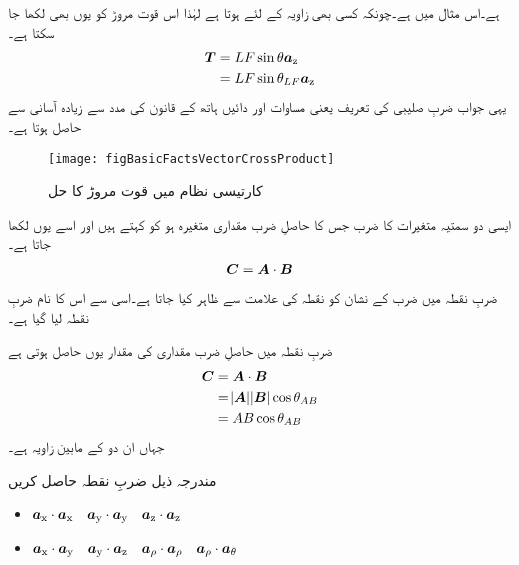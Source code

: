 ہے۔اس مثال میں  ہے۔چونکہ کسی بھی زاویہ    کے لئے  ہوتا ہے لہٰذا اس قوت مروڑ کو یوں بھی لکھا جا سکتا ہے۔
\begin{align*}
{\ensuremath{{\boldsymbol{T}}}}&=LF\sin \theta {\boldsymbol{a}}_{\textup{z}}\\
&=L F \sin \theta_{LF}{\boldsymbol{a}}_{\textup{z}}
\end{align*}
یہی جواب ضربِ صلیبی کی تعریف یعنی مساوات  اور دائیں ہاتھ کے قانون کی مدد سے زیادہ آسانی سے حاصل ہوتا ہے۔
%
\begin{figure}
\centering
\texttt{[image: figBasicFactsVectorCrossProduct]}
\caption{کارتیسی نظام میں قوت مروڑ کا حل}
\label{شکل_حقائق_کارتیسی_مروڑ_کا_حل}
\end{figure}
%
ایسی دو سمتیہ متغیرات کا ضرب جس کا حاصلِ ضرب مقداری متغیرہ ہو کو  کہتے ہیں اور اسے یوں لکھا جاتا ہے۔
\begin{align}
{\ensuremath{{\boldsymbol{C}}}}={{\boldsymbol{A}}} \cdot {\ensuremath{{\boldsymbol{B}}}}
\end{align}
ضربِ نقطہ میں ضرب کے نشان کو نقطہ کی علامت سے ظاہر کیا جاتا ہے۔اسی سے اس کا نام ضربِ نقطہ لیا گیا ہے۔

ضربِ نقطہ میں حاصلِ ضرب مقداری کی مقدار یوں حاصل ہوتی ہے
\begin{gather}
\begin{aligned}\label{مساوات_بنیادی_ضرب_نقطہ_تعریف}
{\ensuremath{{\boldsymbol{C}}}}&={{\boldsymbol{A}}} \cdot {\ensuremath{{\boldsymbol{B}}}}\\
&=\abs{{{\boldsymbol{A}}}} \abs{{{\boldsymbol{B}}}} \cos \theta_{AB}\\
&=A B \cos \theta_{AB}
\end{aligned}
\end{gather}
جہاں  ان دو کے مابین زاویہ ہے۔

مندرجہ ذیل ضربِ نقطہ حاصل کریں
\begin{itemize}
\item
${\boldsymbol{a}}_{\textup{x}} \cdot {\boldsymbol{a}}_{\textup{x}} \quad {\boldsymbol{a}}_{\textup{y}} \cdot {\boldsymbol{a}}_{\textup{y}} \quad {\boldsymbol{a}}_{\textup{z}} \cdot {\boldsymbol{a}}_{\textup{z}}$\\
\item
${\boldsymbol{a}}_{\textup{x}} \cdot {\boldsymbol{a}}_{\textup{y}} \quad {\boldsymbol{a}}_{\textup{y}} \cdot {\boldsymbol{a}}_{\textup{z}} \quad {\boldsymbol{a}}_{\rho} \cdot {\boldsymbol{a}}_{\rho} \quad {\boldsymbol{a}}_{\rho} \cdot {\boldsymbol{a}}_{\theta}$
\end{itemize}

